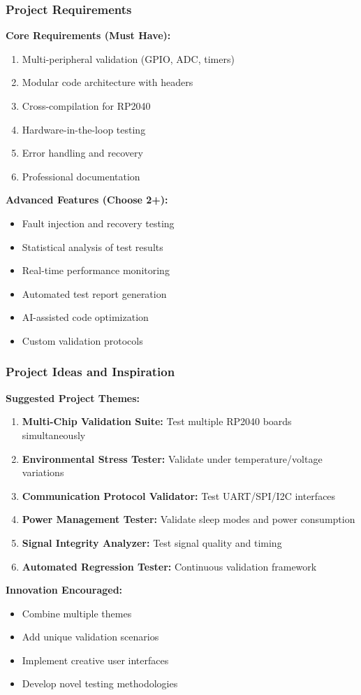 \documentclass{beamer}
\begin{document}
\begin{frame}
\frametitle{Project Requirements}
\textbf{Core Requirements (Must Have):}
\begin{enumerate}
    \item Multi-peripheral validation (GPIO, ADC, timers)
    \item Modular code architecture with headers
    \item Cross-compilation for RP2040
    \item Hardware-in-the-loop testing
    \item Error handling and recovery
    \item Professional documentation
\end{enumerate}

\vspace{0.5cm}
\textbf{Advanced Features (Choose 2+):}
\begin{itemize}
    \item Fault injection and recovery testing
    \item Statistical analysis of test results
    \item Real-time performance monitoring
    \item Automated test report generation
    \item AI-assisted code optimization
    \item Custom validation protocols
\end{itemize}
\end{frame}

\begin{frame}
\frametitle{Project Ideas and Inspiration}
\textbf{Suggested Project Themes:}

\begin{enumerate}
    \item \textbf{Multi-Chip Validation Suite:} Test multiple RP2040 boards simultaneously
    \item \textbf{Environmental Stress Tester:} Validate under temperature/voltage variations
    \item \textbf{Communication Protocol Validator:} Test UART/SPI/I2C interfaces
    \item \textbf{Power Management Tester:} Validate sleep modes and power consumption
    \item \textbf{Signal Integrity Analyzer:} Test signal quality and timing
    \item \textbf{Automated Regression Tester:} Continuous validation framework
\end{enumerate}

\vspace{0.5cm}
\textbf{Innovation Encouraged:}
\begin{itemize}
    \item Combine multiple themes
    \item Add unique validation scenarios
    \item Implement creative user interfaces
    \item Develop novel testing methodologies
\end{itemize}
\end{frame}
\end{document}
